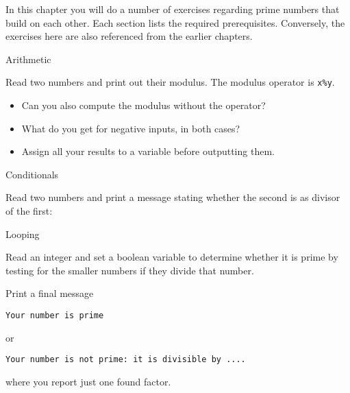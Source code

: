 
In this chapter you will do a number of exercises regarding prime
numbers that build on each other. Each section lists the required
prerequisites. Conversely, the exercises here are also referenced from
the earlier chapters.

 {Arithmetic}


\begin{exercise}
  \label{ex:prime:modvar}
  Read two numbers and print out their modulus.
  The modulus operator is \verb+x%y+.
  \begin{itemize}
  \item
    Can you also compute the modulus without the operator?
  \item What do you get for negative inputs, in both cases?
  \item Assign all your results to a variable before outputting them.
  \end{itemize}
\end{exercise}

 {Conditionals}


\begin{exercise}
  \label{ex:prime:divtest}
  Read two numbers and print a message stating
  whether the second is as divisor of the first:
\end{exercise}

 {Looping}
\label{sec:prime-loop}


\begin{exercise}
  \label{ex:prime:test}
  Read an integer and set a boolean variable to
  determine whether it is prime by testing for the
  smaller numbers if they divide that number. 

  Print a final message
\begin{verbatim}
Your number is prime
\end{verbatim}
or
\begin{verbatim}
Your number is not prime: it is divisible by ....
\end{verbatim}
where you report just one found factor.
\end{exercise}

